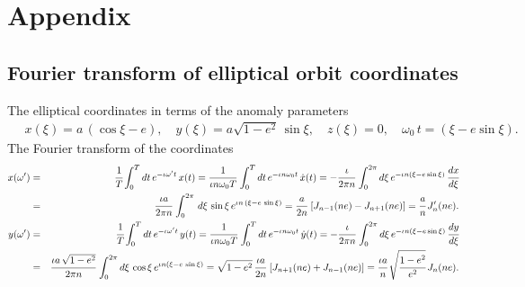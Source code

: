 \documentclass[aps,prd]{revtex4-2}
\begin{document}
\section{Appendix}
\subsection{Fourier transform of elliptical  orbit coordinates}
\label{app:fourier-coordinates}
\noindent The elliptical coordinates in terms of the anomaly parameters
\begin{eqnarray}\label{eq:elliptic-coordinate_App}
\quad x(\xi) = a\,(\cos\xi - e),\quad y(\xi) = a \sqrt{1 - e^2}\,\sin\xi, \quad z(\xi) = 0,\quad \omega_0\, t = (\xi - e\sin\xi).
\end{eqnarray}
The Fourier transform of the coordinates
\begin{eqnarray}\label{eq:fourier-coord-x-y}
    x(\omega^\prime) &=& \cfrac{1}{T}\int_{0}^{T} dt\,e^{-\iota\omega^{\prime}t}\,x(t) =  \cfrac{1}{\iota n\omega_{0} T} \,\int^T_0 dt\,e^{-\iota n\omega_{0} t}\,\dot{x} (t) = -\cfrac{\iota}{2\pi n} \,\int_{0}^{2\pi} d\xi\,e^{-\iota n(\xi -e\sin{\xi})}\,\cfrac{dx}{d\xi} \nonumber \\ &=& \cfrac{\iota a}{2\pi n}\,\int^{2\pi}_0\,d\xi\,\sin\xi\,e^{\iota n \, \left(\xi - e\,\sin\xi \right)} 
    = \cfrac{a}{2n}\,\left[ J_{n-1}(ne) - J_{n+1}(ne) \right]  = \cfrac{a}{n}\,J^\prime_n (ne). \nonumber\\
    y (\omega^\prime) &=& \cfrac{1}{T}\int_{0}^{T} dt\,e^{-\iota\omega^{\prime}t}\,y(t) =  \cfrac{1}{\iota n\omega_{0} T} \,\int^T_0 dt\,e^{-\iota n\omega_{0} t}\,\dot{y} (t) = -\cfrac{\iota}{2\pi n} \,\int_{0}^{2\pi} d\xi\,e^{-\iota n(\xi -e\sin{\xi})}\,\cfrac{dy}{d\xi} \nonumber \\  &=&\cfrac{\iota a\,\sqrt{1-e^2}}{2\pi n }\,\int^{2\pi}_0 d\xi\,\cos\xi\,e^{\iota n \left(\xi - e\,\sin\xi \right)} = \sqrt{1-e^2}\,\cfrac{\iota a}{2n}\,\left[J_{n+1}(ne) + J_{n-1}(ne)\right]
    = \cfrac{\iota a}{n}\,\sqrt{\cfrac{1-e^2}{e^2}}\,J_n (ne).
\end{eqnarray}
\end{document}
